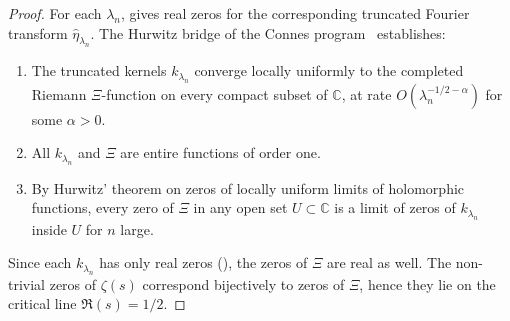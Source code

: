 \documentclass[11pt,a4paper]{article}
\theoremstyle{remark}
\theoremstyle{plain}
\begin{document}
\begin{proof}
For each $\lambda_n$,  gives real zeros for the corresponding
truncated Fourier transform $\widehat\eta_{\lambda_n}$. The Hurwitz bridge of
the Connes program~\cite[Fact~6.4 and Sections~6.4--6.6]{Connes2026} establishes:
\begin{enumerate}[label=(\alph*),leftmargin=*]
  \item The truncated kernels $k_{\lambda_n}$ converge locally uniformly to the
  completed Riemann $\Xi$-function on every compact subset of $\mathbb{C}$, at
  rate $O(\lambda_n^{-1/2-\alpha})$ for some $\alpha>0$.
  \item All $k_{\lambda_n}$ and $\Xi$ are entire functions of order one.
  \item By Hurwitz' theorem on zeros of locally uniform limits of holomorphic
  functions, every zero of $\Xi$ in any open set $U\subset\mathbb{C}$ is a limit
  of zeros of $k_{\lambda_n}$ inside $U$ for $n$ large.
\end{enumerate}
Since each $k_{\lambda_n}$ has only real zeros (), the zeros of
$\Xi$ are real as well. The non-trivial zeros of $\zeta(s)$ correspond bijectively
to zeros of $\Xi$, hence they lie on the critical line $\Re(s)=1/2$.
\end{proof}
\end{document}
